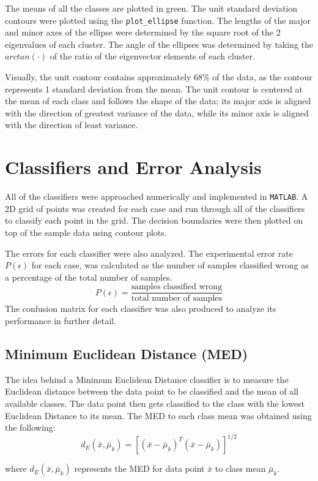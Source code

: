\documentclass{article}
\begin{document}
The means of all the classes are plotted in green. The unit standard deviation contours were plotted using the \verb|plot_ellipse| function. The lengths of the major and minor axes of the ellipse were determined by the square root of the 2 eigenvalues of each cluster. The angle of the ellipses was determined by taking the $arctan(\cdot)$ of the ratio of the eigenvector elements of each cluster.

Visually, the unit contour contains approximately 68\% of the data, as the contour represents 1 standard deviation from the mean. The unit contour is centered at the mean of each class and follows the shape of the data; its major axis is aligned with the direction of greatest variance of the data, while its minor axis is aligned with the direction of least variance.


\section{Classifiers and Error Analysis}

All of the classifiers were approached numerically and implemented in \verb|MATLAB|. A 2D grid of points was created for each case and run through all of the classifiers to classify each point in the grid. The decision boundaries were then plotted on top of the sample data using contour plots.

The errors for each classifier were also analyzed. The experimental error rate $P(\epsilon)$ for each case, was calculated as the number of samples classified wrong as a percentage of the total number of samples.
$$
P(\epsilon) = \frac{\text{samples classified wrong}}{\text{{total number of samples}}}
$$
The confusion matrix for each classifier was also produced to analyze its performance in further detail.

\subsection{Minimum Euclidean Distance (MED)}
The idea behind a Minimum Euclidean Distance classifier is to measure the Euclidean distance between the data point to be classified and the mean of all available classes. The data point then gets classified to the class with the lowest Euclidean Distance to its mean. The MED to each class mean was obtained using the following:
\[d_E(\bar{x}, \bar{\mu}_{k}) = [(\bar{x} - \bar{\mu}_{k})^{T}(\bar{x} - \bar{\mu}_{k})]^{1/2}\]

where $d_E(\bar{x}, \bar{\mu}_k)$ represents the MED for data point $\bar{x}$ to class mean $\bar{\mu}_{k}$.
\end{document}
